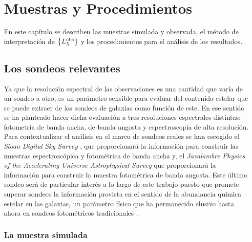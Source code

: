 \chapter{Muestras y Procedimientos}

\label{ch:samples-procedure}

En este capítulo se describen las muestras simulada y observada, el método de interpretación de
$\left\{{L}_\lambda^\text{obs}\right\}$ y los procedimientos para el análisis de los resultados.


\section{Los sondeos relevantes}

Ya que la resolución espectral de las observaciones es una cantidad que varía de un sondeo a otro,
es un parámetro sensible para evaluar del contenido estelar que se puede extraer de los sondeos de
galaxias como función de este. En ese sentido se ha planteado hacer dicha evaluación a tres
resoluciones espectrales distintas: fotometría de banda ancha, de banda angosta y espectroscopía de
alta resolución. Para contextualizar el análisis en el marco de sondeos reales se han escogido el
\emph{Sloan Digital Sky Survey} \citep[SDSS,][]{York2000}, que proporcionará la información para
construir las muestras espectroscópica \citep{Strauss2002} y fotométrica de banda ancha
\citep{Gunn1998} y, el \emph{Javalambre Physics of the Accelerating Universe Astrophysical Survey}
\citep[J-PAS,][]{Benitez2014,Dupke2015} que proporcionará la información para construir la muestra
fotométrica de banda angosta. Este último sondeo será de particular interés a lo largo de este
trabajo puesto que promete superar sondeos la información provista en el sentido de la abundancia
química estelar en las galaxias, un parámetro físico que ha permanecido elusivo hasta ahora en
sondeos fotométricos tradicionales \citep[aún así véase,][]{MacArthur2010}.

\subsection{La muestra simulada}\label{sc:mock-sample}

